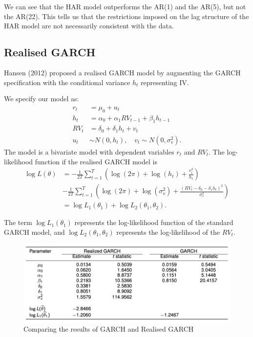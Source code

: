 \documentclass[11pt]{article}
\begin{document}
We can see that the HAR model outperforms the AR(1) and the AR(5), but not the AR(22). This tells us that the restrictions imposed on the lag structure of the HAR model are not necessarily consistent with the data.

\subsection{Realised GARCH}

Hansen (2012) proposed a realised GARCH model by augmenting the GARCH specification with the conditional variance $h_t$ representing IV.

\begin{definition}
We specify our model as:
    \begin{equation}
    \label{Realised GARCH}
\begin{aligned}
r_t & =\mu_0+u_t \\
h_t & =\alpha_0+\alpha_1 R V_{t-1}+\beta_1 h_{t-1} \\
R V_t & =\delta_0+\delta_1 h_t+v_t \\
u_t & \sim N\left(0, h_t\right), \quad v_t \sim N\left(0, \sigma_v^2\right) .
\end{aligned}
\end{equation}
The model is a bivariate model with dependent variables $r_t$ and $RV_t$. The log-likelihood function if the realised GARCH model is
\begin{equation}
\begin{aligned}
\log L(\theta)&=-\frac{1}{2 T} \sum_{t=1}^T\left(\log (2 \pi)+\log \left(h_t\right)+\frac{r_t^2}{h_t}\right) \\
&-\frac{1}{2 T} \sum_{t=1}^T\left(\log (2 \pi)+\log \left(\sigma_v^2\right)+\frac{\left(R V_t-\delta_0-\delta_1 h_t\right)^2}{\sigma_v^2}\right) \\
&= \log L_1(\theta_1) + \log L_2 (\theta_1, \theta_2).
\end{aligned}
\end{equation}

The term $\log L_1(\theta_1)$ represents the log-likelihood function of the standard GARCH model, and $\log L_2 (\theta_1, \theta_2)$ represents the log-likelihood of the $RV_t$.
\end{definition}
\newpage

\begin{figure}[h]
    \centering
    \includegraphics{pics/realised GARCH vs GARCH.png}
    \caption{Comparing the results of GARCH and Realised GARCH}
    \label{fig: GARCH vs Realised GARCH}
\end{figure}
\end{document}
